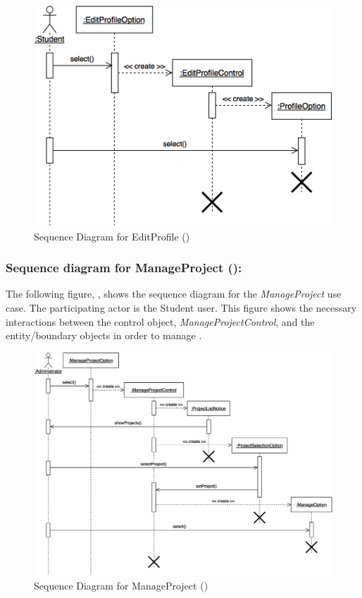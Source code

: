\documentclass[12pt,letterpaper]{article}
\begin{document}
\begin{figure}[H]
	\centering{}
	\includegraphics[scale=0.25]{imgs/seq/edit-profile.png}
	\caption[ - Sequence Diagram for EditProfile]{Sequence Diagram for EditProfile ()}
\end{figure}

\subsubsection*{Sequence diagram for ManageProject ():}

The following figure, , shows the sequence diagram for the {\it ManageProject} use case. The participating actor is the
Student user. This figure shows the necessary interactions between the control object, {\it ManageProjectControl}, and the entity/boundary objects 
in order to manage .

\begin{figure}[H]
	\centering{}
	\includegraphics[scale=0.24]{imgs/seq/manage-project.png}
	\caption[ - Sequence Diagram for ManageProject]{Sequence Diagram for ManageProject ()}
\end{figure}
\end{document}
